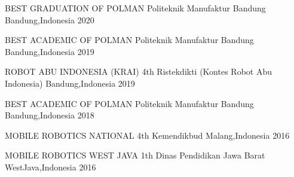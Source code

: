 

\begin{cvhonors}

  \cvhonor
    {BEST GRADUATION OF POLMAN} %
    {Politeknik Manufaktur Bandung} %
    {Bandung,Indonesia} %
    {2020} %

  \cvhonor
    {BEST ACADEMIC OF POLMAN} %
    {Politeknik Manufaktur Bandung} %
    {Bandung,Indonesia} %
    {2019} %

  \cvhonor
    {ROBOT ABU INDONESIA (KRAI) 4th} %
    {Ristekdikti (Kontes Robot Abu Indonesia)} %
    {Bandung,Indonesia} %
    {2019} %

  \cvhonor
    {BEST ACADEMIC OF POLMAN} %
    {Politeknik Manufaktur Bandung} %
    {Bandung,Indonesia} %
    {2018} %

  \cvhonor
    {MOBILE ROBOTICS NATIONAL 4th} %
    {Kemendikbud} %
    {Malang,Indonesia} %
    {2016} %
    
  \cvhonor
    {MOBILE ROBOTICS WEST JAVA 1th} %
    {Dinas Pendidikan Jawa Barat} %
    {WestJava,Indonesia} %
    {2016} %

\end{cvhonors}